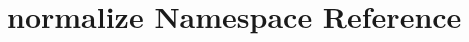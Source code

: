 \hypertarget{namespacenormalize}{\section{normalize Namespace Reference}
\label{namespacenormalize}
}

